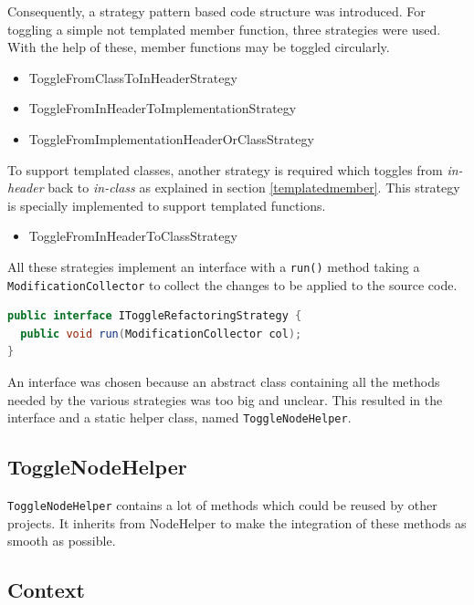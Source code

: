 Consequently, a strategy pattern based code structure was introduced. For
toggling a simple not templated member function, three strategies were used.
With the help of these, member functions may be toggled circularly.

\begin{itemize}
\item ToggleFromClassToInHeaderStrategy
\item ToggleFromInHeaderToImplementationStrategy
\item ToggleFromImplementationHeaderOrClassStrategy
\end{itemize}

To support templated classes, another strategy is required which toggles from
\textit{in-header} back to \textit{in-class} as explained in section
\ref{templatedmember}. This strategy is specially implemented to support
templated functions.

\begin{itemize}
\item ToggleFromInHeaderToClassStrategy
\end{itemize}

All these strategies implement an interface with a \texttt{run()} method taking
a \texttt{ModificationCollector} to collect the changes to be applied to the 
source code.

\begin{lstlisting}[caption={IToggleRefactoringStrategy},
label={01templatedMember}, language=Java]
public interface IToggleRefactoringStrategy {
  public void run(ModificationCollector col);
}
\end{lstlisting}

An interface was chosen because an abstract class containing all the methods
needed by the various strategies was too big and unclear. This resulted in the
interface and a static helper class, named \texttt{ToggleNodeHelper}.

\subsection{ToggleNodeHelper}

\texttt{ToggleNodeHelper} contains a lot of methods which could be reused by
other projects. It inherits from NodeHelper to make the integration of these
methods as smooth as possible.

\subsection{Context}

